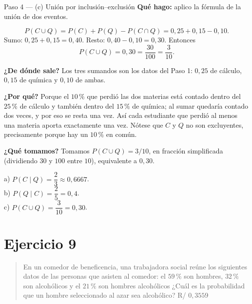 \documentclass[11pt]{article}
\begin{document}
\begin{paso}{Paso 4 --- (c) Unión por inclusión--exclusión}
\textbf{Qué hago:} aplico la fórmula de la unión de dos eventos.

\[
P(C\cup Q)=P(C)+P(Q)-P(C\cap Q)=0{,}25+0{,}15-0{,}10.
\]
Sumo: $0{,}25+0{,}15=0{,}40$. Resto: $0{,}40-0{,}10=0{,}30$. Entonces
\[
P(C\cup Q)=0{,}30=\frac{30}{100}=\frac{3}{10}.
\]

\textbf{¿De dónde sale?} Los tres sumandos son los datos del Paso 1: $0{,}25$ de cálculo, $0{,}15$ de química y $0{,}10$ de ambas.

\textbf{¿Por qué?} Porque el $10\,\%$ que perdió las dos materias está contado dentro del $25\,\%$ de cálculo y también dentro del $15\,\%$ de química; al sumar quedaría contado dos veces, y por eso se resta una vez. Así cada estudiante que perdió al menos una materia aporta exactamente una vez. Nótese que $C$ y $Q$ no son excluyentes, precisamente porque hay un $10\,\%$ en común.

\textbf{¿Qué tomamos?} Tomamos $P(C\cup Q)=3/10$, en fracción simplificada (dividiendo $30$ y $100$ entre $10$), equivalente a $0{,}30$.
\end{paso}

\begin{resp}
a) $P(C\mid Q)=\dfrac{2}{3}\approx 0{,}6667$.\\[2pt]
b) $P(Q\mid C)=\dfrac{2}{5}=0{,}4$.\\[2pt]
c) $P(C\cup Q)=\dfrac{3}{10}=0{,}30$.
\end{resp}

\section*{Ejercicio 9}

\begin{quote}
En un comedor de beneficencia, una trabajadora social reúne los siguientes datos de las personas que asisten al comedor: el $59\,\%$ son hombres, $32\,\%$ son alcohólicos y el $21\,\%$ son hombres alcohólicos ¿Cuál es la probabilidad que un hombre seleccionado al azar sea alcohólico? \hfill R/ $0{,}3559$
\end{quote}
\end{document}
